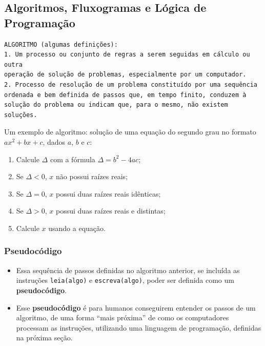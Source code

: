 \documentclass[12pt,a4paper]{article}
\providecommand{\tightlist}{%
      \setlength{\itemsep}{0pt}\setlength{\parskip}{0pt}}
\begin{document}
    \hypertarget{algoritmos-fluxogramas-e-luxf3gica-de-programauxe7uxe3o}{%
\subsection{Algoritmos, Fluxogramas e Lógica de
Programação}\label{algoritmos-fluxogramas-e-luxf3gica-de-programauxe7uxe3o}}

    \begin{verbatim}
ALGORITMO (algumas definições):
1. Um processo ou conjunto de regras a serem seguidas em cálculo ou outra
operação de solução de problemas, especialmente por um computador.
2. Processo de resolução de um problema constituído por uma sequência 
ordenada e bem definida de passos que, em tempo finito, conduzem à 
solução do problema ou indicam que, para o mesmo, não existem soluções.
\end{verbatim}

    Um exemplo de algoritmo: solução de uma equação do segundo grau no
formato \(ax^2 + bx + c\), dados \(a\), \(b\) e \(c\):

\begin{enumerate}
\def\labelenumi{\arabic{enumi}.}
\tightlist
\item
  Calcule \(\Delta\) com a fórmula \(\Delta = b^2-4ac\);
\item
  Se \(\Delta < 0\), \(x\) não possui raízes reais;
\item
  Se \(\Delta = 0\), \(x\) possui duas raízes reais idênticas;
\item
  Se \(\Delta > 0\), \(x\) possui duas raízes reais e distintas;
\item
  Calcule \(x\) usando a equação.
\end{enumerate}

    \hypertarget{pseudocuxf3digo}{%
\subsubsection{Pseudocódigo}\label{pseudocuxf3digo}}

    \begin{itemize}
\item
  Essa sequência de passos definidas no algoritmo anterior, se incluída
  as instruções \texttt{leia(algo)} e \texttt{escreva(algo)}, poder ser
  definida como um \textbf{pseudocódigo}.
\item
  Esse \textbf{pseudocódigo} é para humanos conseguirem entender os
  passos de um algoritmo, de uma forma ``mais próxima'' de como os
  computadores processam as instruções, utilizando uma linguagem de
  programação, definidas na próxima seção.
\end{itemize}
\end{document}
